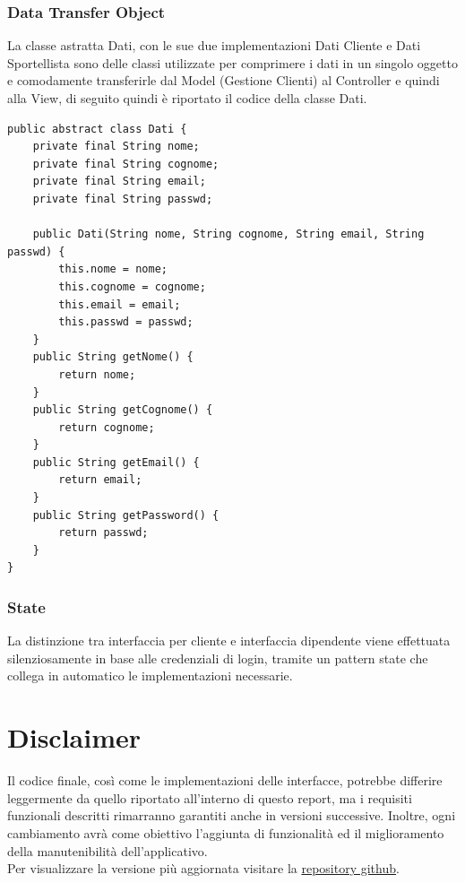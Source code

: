 \subsubsection{Data Transfer Object}
La classe astratta Dati, con le sue due implementazioni Dati Cliente e Dati Sportellista sono delle classi utilizzate per comprimere i dati in un singolo oggetto e comodamente transferirle dal Model (Gestione Clienti) al Controller e quindi alla View, di seguito quindi è riportato il codice della classe Dati.
\begin{verbatim}
public abstract class Dati {
	private final String nome;
	private final String cognome;
	private final String email;
	private final String passwd;
	
	public Dati(String nome, String cognome, String email, String passwd) {
		this.nome = nome;
		this.cognome = cognome;
		this.email = email;
		this.passwd = passwd;
	}
	public String getNome() {
		return nome;
	}
	public String getCognome() {
		return cognome;
	}
	public String getEmail() {
		return email;
	}
	public String getPassword() {
		return passwd;
	}
}
\end{verbatim}
\subsubsection{State}

La distinzione tra interfaccia per cliente e interfaccia dipendente viene effettuata silenziosamente in base alle credenziali di login, tramite un pattern state che collega in automatico le implementazioni necessarie.

\section{Disclaimer}
Il codice finale, così come le implementazioni delle interfacce, potrebbe differire leggermente da quello riportato all'interno di questo report, ma i requisiti funzionali descritti rimarranno garantiti anche in versioni successive. Inoltre, ogni cambiamento avrà come obiettivo l'aggiunta di funzionalità ed il miglioramento della manutenibilità dell'applicativo. \\
Per visualizzare la versione più aggiornata visitare la \href{https://github.com/Zi0LEO/SistemiInformativi}{repository github}.

